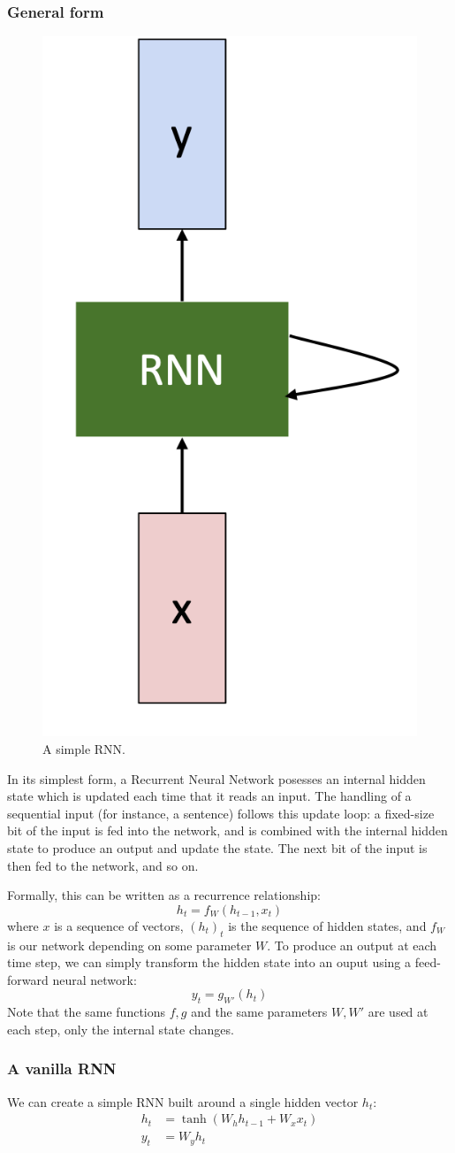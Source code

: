 \subsubsection{General form}
\begin{figure}
    \centering
    \includegraphics[width=.2\textwidth]{images/vanilla-rnn.png}
    \caption{A simple RNN.}
\end{figure}
In its simplest form, a Recurrent Neural Network posesses an internal hidden state which is updated each time that it reads an input. The handling of a sequential input (for instance, a sentence) follows this update loop: a fixed-size bit of the input is fed into the network, and is combined with the internal hidden state to produce an output and update the state. The next bit of the input is then fed to the network, and so on. 

Formally, this can be written as a recurrence relationship:
\begin{equation*}
    h_t = f_W(h_{t-1}, x_t)
\end{equation*}
where $x$ is a sequence of vectors, $(h_t)_t$ is the sequence of hidden states, and $f_W$ is our network depending on some parameter $W$. To produce an output at each time step, we can simply transform the hidden state into an ouput using a feed-forward neural network:
\begin{equation*}
    y_t = g_{W'}(h_t)
\end{equation*}
Note that the same functions $f, g$ and the same parameters $W, W'$ are used at each step, only the internal state changes.

\subsubsection{A vanilla RNN}
We can create a simple RNN built around a single hidden vector $h_t$:
\begin{equation*}
    \begin{aligned}
        h_t &= \tanh\left(W_h h_{t-1} + W_x x_t\right)\\
        y_t &= W_y h_t
    \end{aligned}
\end{equation*}

